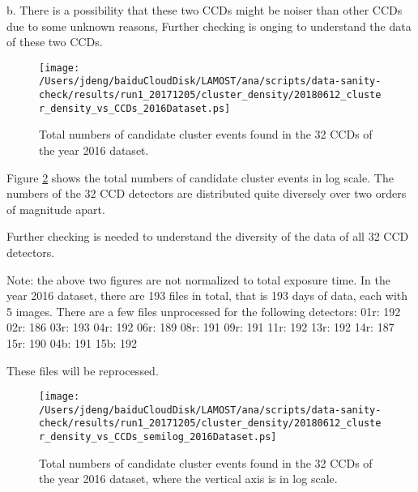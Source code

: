 \documentclass[12pt,twoside,letterpaper]{article}
\begin{document}
b. There is a possibility that these two CCDs might be noiser than other CCDs due to some unknown reasons, 
Further checking is onging to understand the data of these two CCDs. 


   \begin{figure}[!htbp]
   \begin{center}
       \texttt{[image: /Users/jdeng/baiduCloudDisk/LAMOST/ana/scripts/data-sanity-check/results/run1\_20171205/cluster\_density/20180612\_cluster\_density\_vs\_CCDs\_2016Dataset.ps]}
       \caption{Total numbers of candidate cluster events found in the 32 CCDs of the year 2016 dataset.}  
       \label{Fig:CluVsIDet}
   \end{center}    
   \end{figure}

Figure \ref{Fig:Semilog_CluVsIDet} shows the total numbers of
candidate cluster events in log scale. The numbers of the 32 CCD detectors are distributed quite diversely over two orders of magnitude apart. 

Further checking is needed to understand the diversity of the data of all 32 CCD detectors. 

Note: the above two figures are not normalized to total exposure time.
In the year 2016 dataset, there are 193 files in total, that
is 193 days of data, each with 5 images. There are a few files
unprocessed for the following detectors: 
    01r:  192
    02r:  186
    03r:  193
    04r:  192
    06r:  189
    08r:  191
    09r:  191
    11r:  192
    13r:  192
    14r:  187
    15r:  190
    04b:  191
    15b:  192

These files will be reprocessed. %


   \begin{figure}[!htbp]
   \begin{center}
       \texttt{[image: /Users/jdeng/baiduCloudDisk/LAMOST/ana/scripts/data-sanity-check/results/run1\_20171205/cluster\_density/20180612\_cluster\_density\_vs\_CCDs\_semilog\_2016Dataset.ps]}
       \caption{Total numbers of candidate cluster events found in the 32 CCDs of the year 2016 dataset, where the vertical axis is in log scale.}  
       \label{Fig:Semilog_CluVsIDet}
   \end{center}    
   \end{figure}
\end{document}
